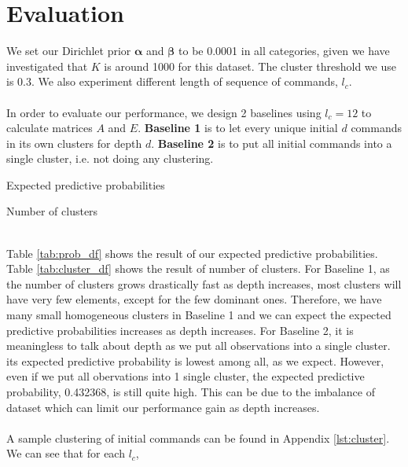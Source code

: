 \chapter{Evaluation}
We set our Dirichlet prior \(\boldsymbol{\alpha}\) and \(\boldsymbol{\beta}\) to be 
0.0001 in all categories, given we have investigated that \(K\) is around 1000 for this dataset.
The cluster threshold we use is \(0.3\).
We also experiment different length of sequence of commands, \(l_c\).
\\\\
In order to evaluate our performance, we design 2 baselines using \(l_c=12\) to calculate matrices \(A\) and \(E\). 
\textbf{Baseline 1} is to let every unique initial \(d\) commands in its own clusters for depth \(d\).
\textbf{Baseline 2} is to put all initial commands into a single cluster, i.e. not doing any clustering.
\begin{table}[h]
    \centering
    
    \caption{Expected predictive probabilities}
    \label{tab:prob_df}
\end{table}
\begin{table}[h]
    \centering
    
    \caption{Number of clusters}
    \label{tab:cluster_df}
\end{table}
\\
Table \ref{tab:prob_df} shows the result of our expected predictive probabilities.
Table \ref{tab:cluster_df} shows the result of number of clusters.
For Baseline 1, as the number of clusters grows drastically fast as depth increases,
most clusters will have very few elements, except for the few dominant ones.
Therefore, we have many small homogeneous clusters in Baseline 1
and we can expect the expected predictive probabilities increases as depth increases.
For Baseline 2, it is meaningless to talk about depth as we put all observations into a single cluster.
its expected predictive probability is lowest among all, as we expect.
However, even if we put all obervations into 1 single cluster,
the expected predictive probability, 0.432368, is still quite high.
This can be due to the imbalance of dataset which can limit our performance gain as depth increases.
\\\\
A sample clustering of initial commands can be found in Appendix \ref{lst:cluster}.
We can see that for each \(l_c\), 